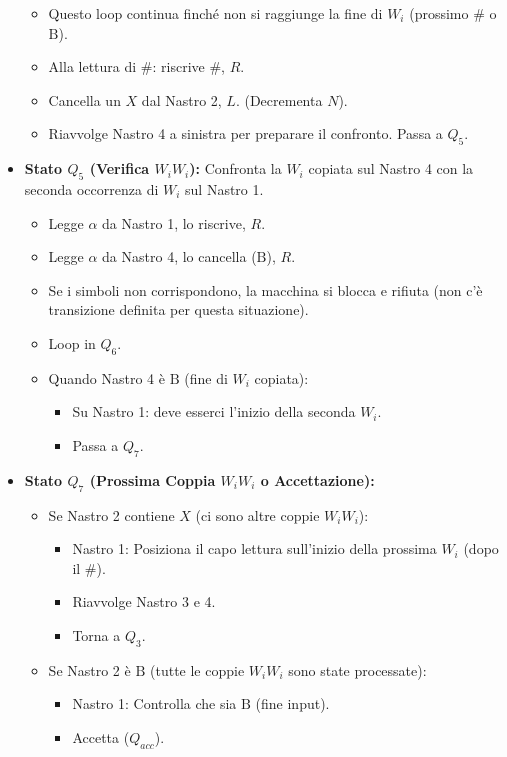\documentclass[a4paper, 11pt]{book} %
\theoremstyle{definition}
\newcommand{\B}{\text{B}} %
\begin{document}
\begin{itemize}
\begin{itemize}
            \item Questo loop continua finché non si raggiunge la fine di $W_i$ (prossimo $\#$ o $\B$).
            \item Alla lettura di $\#$: riscrive $\#$, $R$.
            \item Cancella un $X$ dal Nastro 2, $L$. (Decrementa $N$).
            \item Riavvolge Nastro 4 a sinistra per preparare il confronto. Passa a $Q_5$.
        \end{itemize}
    \item \textbf{Stato $Q_5$ (Verifica $W_i W_i$):}
        Confronta la $W_i$ copiata sul Nastro 4 con la seconda occorrenza di $W_i$ sul Nastro 1.
        \begin{itemize}
            \item Legge $\alpha$ da Nastro 1, lo riscrive, $R$.
            \item Legge $\alpha$ da Nastro 4, lo cancella ($\B$), $R$.
            \item Se i simboli non corrispondono, la macchina si blocca e rifiuta (non c'è transizione definita per questa situazione).
            \item Loop in $Q_6$.
            \item Quando Nastro 4 è $\B$ (fine di $W_i$ copiata):
                \begin{itemize}
                    \item Su Nastro 1: deve esserci l'inizio della seconda $W_i$.
                    \item Passa a $Q_7$.
                \end{itemize}
        \end{itemize}
    \item \textbf{Stato $Q_7$ (Prossima Coppia $W_i W_i$ o Accettazione):}
        \begin{itemize}
            \item Se Nastro 2 contiene $X$ (ci sono altre coppie $W_i W_i$):
                \begin{itemize}
                    \item Nastro 1: Posiziona il capo lettura sull'inizio della prossima $W_i$ (dopo il $\#$).
                    \item Riavvolge Nastro 3 e 4.
                    \item Torna a $Q_3$.
                \end{itemize}
            \item Se Nastro 2 è $\B$ (tutte le coppie $W_i W_i$ sono state processate):
                \begin{itemize}
                    \item Nastro 1: Controlla che sia $\B$ (fine input).
                    \item Accetta ($Q_{acc}$).
                \end{itemize}
        \end{itemize}
\end{itemize}
\end{document}
